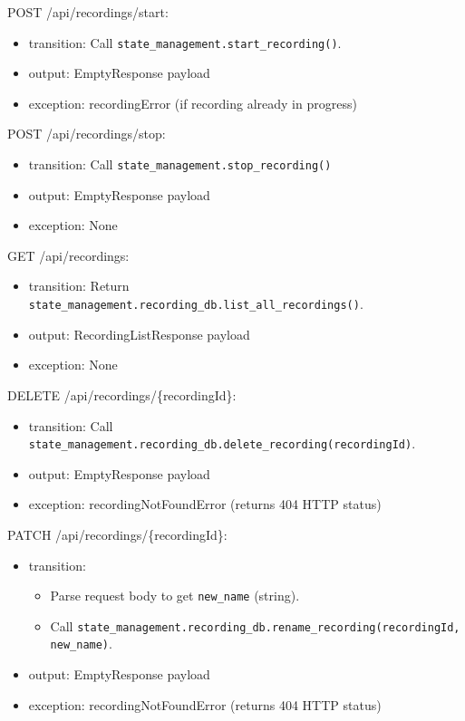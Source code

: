 \documentclass[12pt, titlepage]{article}
\begin{document}
\noindent POST /api/recordings/start:
\begin{itemize}
  \item transition: Call \texttt{state\_management.start\_recording()}.
  \item output: EmptyResponse payload
  \item exception: recordingError (if recording already in progress)
\end{itemize}

\noindent POST /api/recordings/stop:
\begin{itemize}
  \item transition: Call \texttt{state\_management.stop\_recording()}
  \item output: EmptyResponse payload
  \item exception: None
\end{itemize}

\noindent GET /api/recordings:
\begin{itemize}
  \item transition: Return
        \texttt{state\_management.recording\_db.list\_all\_recordings()}.
  \item output: RecordingListResponse payload
  \item exception: None
\end{itemize}

\noindent DELETE /api/recordings/\{recordingId\}:
\begin{itemize}
  \item transition: Call
        \texttt{state\_management.recording\_db.delete\_recording(recordingId)}.
  \item output: EmptyResponse payload
  \item exception: recordingNotFoundError (returns 404 HTTP status)
\end{itemize}

\noindent PATCH /api/recordings/\{recordingId\}:
\begin{itemize}
  \item transition:
        \begin{itemize}
          \item Parse request body to get \texttt{new\_name} (string).
          \item Call \texttt{state\_management.recording\_db.rename\_recording(recordingId,
                  new\_name)}.
        \end{itemize}
  \item output: EmptyResponse payload
  \item exception: recordingNotFoundError (returns 404 HTTP status)
\end{itemize}
\end{document}
